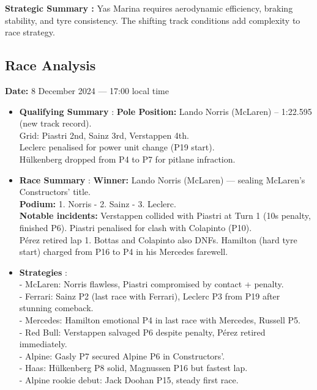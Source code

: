 \textbf{Strategic Summary :} Yas Marina requires aerodynamic efficiency, braking stability, and tyre consistency. The shifting track conditions add complexity to race strategy.

\subsection{Race Analysis}

\textbf{Date:} 8 December 2024 — 17:00 local time 

\begin{itemize}
    \item \textbf{Qualifying Summary} : \textbf{Pole Position:} Lando Norris (McLaren) – 1:22.595 (new track record). \\
    Grid: Piastri 2nd, Sainz 3rd, Verstappen 4th. \\
    Leclerc penalised for power unit change (P19 start). \\
    Hülkenberg dropped from P4 to P7 for pitlane infraction.

    \item \textbf{Race Summary} : \textbf{Winner:} Lando Norris (McLaren) — sealing McLaren’s Constructors’ title. \\
    \textbf{Podium:} 1. Norris - 2. Sainz - 3. Leclerc. \\
    \textbf{Notable incidents:} Verstappen collided with Piastri at Turn 1 (10s penalty, finished P6). Piastri penalised for clash with Colapinto (P10). \\
    Pérez retired lap 1. Bottas and Colapinto also DNFs. Hamilton (hard tyre start) charged from P16 to P4 in his Mercedes farewell.

    \item \textbf{Strategies} : \\
    - McLaren: Norris flawless, Piastri compromised by contact + penalty. \\
    - Ferrari: Sainz P2 (last race with Ferrari), Leclerc P3 from P19 after stunning comeback. \\
    - Mercedes: Hamilton emotional P4 in last race with Mercedes, Russell P5. \\
    - Red Bull: Verstappen salvaged P6 despite penalty, Pérez retired immediately. \\
    - Alpine: Gasly P7 secured Alpine P6 in Constructors’. \\
    - Haas: Hülkenberg P8 solid, Magnussen P16 but fastest lap. \\
    - Alpine rookie debut: Jack Doohan P15, steady first race.


\end{itemize}
